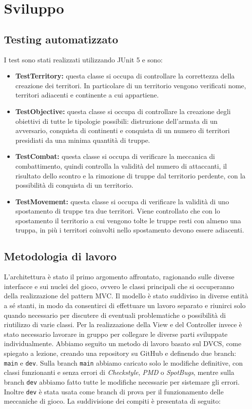 \documentclass[a4paper,12pt]{report}
\begin{document}
\chapter{Sviluppo}
%
\section{Testing automatizzato}
I test sono stati realizzati utilizzando JUnit 5 e sono:
\begin{itemize}
    \item \textbf{TestTerritory:} questa classe si occupa di controllare la correttezza della creazione dei territori. In particolare di un territorio vengono verificati nome, territori adiacenti e continente a cui appartiene.
    \item \textbf{TestObjective:} questa classe si occupa di controllare la creazione degli obiettivi di tutte le tipologie possibili: distruzione dell'armata di un avversario, conquista di continenti e conquista di un numero di territori presidiati da una minima quantit\`a di truppe.
    \item \textbf{TestCombat:} questa classe si occupa di verificare la meccanica di combattimento, quindi controlla la validit\`a del numero di attaccanti, il risultato dello scontro e la rimozione di truppe dal territorio perdente, con la possibilit\`a di conquista di un territorio.
    \item \textbf{TestMovement:} questa classe si occupa di verificare la validit\`a di uno spostamento di truppe tra due territori. Viene controllato che con lo spostamento il territorio a cui vengono tolte le truppe resti con almeno una truppa, in pi\`u i territori coinvolti nello spostamento devono essere adiacenti.
\end{itemize}
%
\section{Metodologia di lavoro}
L'architettura \`e stato il primo argomento affrontato, ragionando sulle diverse interfacce e sui nuclei del gioco, ovvero le classi principali che si occuperanno della realizzazione del pattern MVC. Il modello \`e stato suddiviso in diverse entit\`a a s\'e stanti, in modo da consentirci di effettuare un lavoro separato e riunirci solo quando necessario per discutere di eventuali problematiche o possibilit\`a di riutilizzo di varie classi. Per la realizzazione della View e del Controller invece \`e stato necessario lavorare in gruppo per collegare le diverse parti sviluppate individualmente. Abbiamo seguito un metodo di lavoro basato sul DVCS, come spiegato a lezione, creando una repository su GitHub e definendo due branch: \texttt{main} e \texttt{dev}. Sulla branch \texttt{main} abbiamo caricato solo le modifiche definitive, con classi funzionanti e senza errori di \textit{Checkstyle}, \textit{PMD} o \textit{SpotBugs}, mentre sulla branch \texttt{dev} abbiamo fatto tutte le modifiche necessarie per sistemare gli errori. Inoltre \texttt{dev} \`e stata usata come branch di prova per il funzionamento delle meccaniche di gioco.
\newline
La suddivisione dei compiti \`e presentata di seguito:
\end{document}
